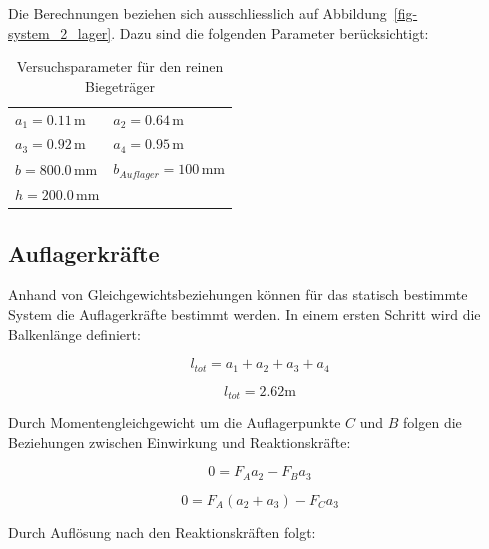 \documentclass[
  letterpaper,
]{scrreprt}
\begin{document}
Die Berechnungen beziehen sich ausschliesslich auf
Abbildung~\ref{fig-system_2_lager}. Dazu sind die folgenden Parameter
berücksichtigt:

\hypertarget{tbl-params_reiner_biegetraeger}{}
\begin{longtable}[]{@{}
  >{\raggedright\arraybackslash}p{}
  >{\raggedright\arraybackslash}p{}@{}}
\caption{\label{tbl-params_reiner_biegetraeger}Versuchsparameter für den
reinen Biegeträger}\tabularnewline
\toprule\noalign{}
\endfirsthead
\endhead
\bottomrule\noalign{}
\endlastfoot
\(a_{1} = 0.11 \, \text{m}\) & \(a_{2} = 0.64 \, \text{m}\) \\
\(a_{3} = 0.92 \, \text{m}\) & \(a_{4} = 0.95 \, \text{m}\) \\
\(b = 800.0 \, \text{mm}\) & \(b_{Auflager} = 100 \, \text{mm}\) \\
\(h = 200.0 \, \text{mm}\) & \\
\end{longtable}

\hypertarget{auflagerkruxe4fte}{%
\subsection{Auflagerkräfte}\label{auflagerkruxe4fte}}

Anhand von Gleichgewichtsbeziehungen können für das statisch bestimmte
System die Auflagerkräfte bestimmt werden. In einem ersten Schritt wird
die Balkenlänge definiert:

\begin{equation}l_{tot} = a_{1} + a_{2} + a_{3} + a_{4}\end{equation}

\begin{equation}l_{tot} = 2.62 \text{m}\end{equation}

Durch Momentengleichgewicht um die Auflagerpunkte \(C\) und \(B\) folgen
die Beziehungen zwischen Einwirkung und Reaktionskräfte:

\begin{equation}0 = F_{A} a_{2} - F_{B} a_{3}\end{equation}

\begin{equation}0 = F_{A} \left(a_{2} + a_{3}\right) - F_{C} a_{3}\end{equation}

Durch Auflösung nach den Reaktionskräften folgt:
\end{document}
